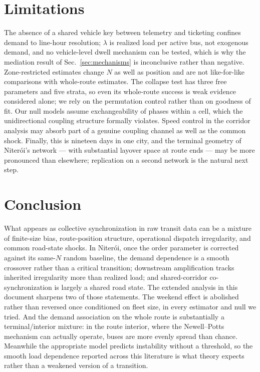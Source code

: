 \documentclass[9pt,twocolumn,twoside]{opticajnl}
\begin{document}
\section{Limitations}\label{sec:limits}

The absence of a shared vehicle key between telemetry and ticketing confines demand to
line-hour resolution; $\lambda$ is realized load per active bus, not exogenous demand, and no
vehicle-level dwell mechanism can be tested, which is why the mediation result of
Sec.~\ref{sec:mechanisms} is inconclusive rather than negative. Zone-restricted estimates change
$N$ as well as position and are not like-for-like comparisons with whole-route estimates. The
collapse test has three free parameters and five strata, so even its whole-route success is weak
evidence considered alone; we rely on the permutation control rather than on goodness of fit.
Our null models assume exchangeability of phases within a cell, which the unidirectional
coupling structure formally violates. Speed control in the corridor analysis may absorb part of a
genuine coupling channel as well as the common shock. Finally, this is nineteen days in one city,
and the terminal geometry of Niter\'oi's network --- with substantial layover space at route ends
--- may be more pronounced than elsewhere; replication on a second network is the natural next
step.

\section{Conclusion}

What appears as collective synchronization in raw transit data can be a mixture of finite-size
bias, route-position structure, operational dispatch irregularity, and common road-state shocks.
In Niter\'oi, once the order parameter is corrected against its same-$N$ random baseline, the
demand dependence is a smooth crossover rather than a critical transition; downstream
amplification tracks inherited irregularity more than realized load; and shared-corridor
co-synchronization is largely a shared road state. The extended analysis in this document
sharpens two of those statements. The weekend effect is abolished rather than reversed once
conditioned on fleet size, in every estimator and null we tried. And the demand association on
the whole route is substantially a terminal/interior mixture: in the route interior, where the
Newell--Potts mechanism can actually operate, buses are more evenly spread than chance. Meanwhile
the appropriate model predicts instability without a threshold, so the smooth load dependence
reported across this literature is what theory expects rather than a weakened version of a
transition.
\end{document}
